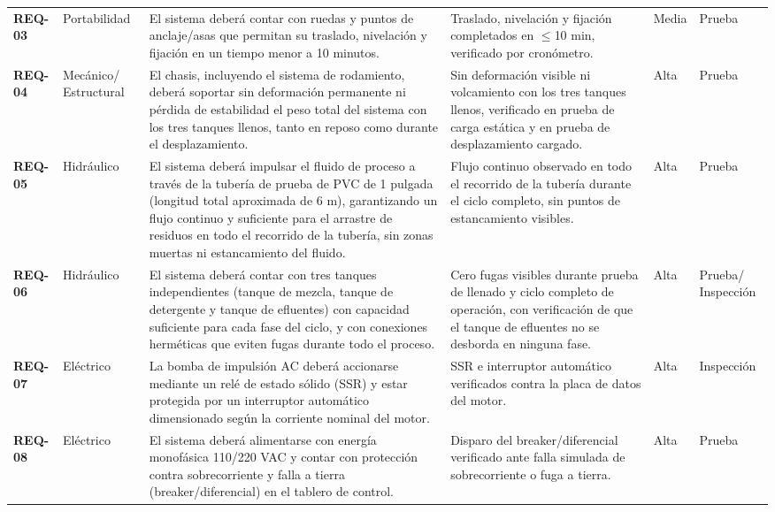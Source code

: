 \begin{longtable}{
  >{\bfseries}p{\colID}
  p{\colCat}
  p{\colReq}
  p{\colCrit}
  p{\colPrio}
  p{\colVer}
}
REQ-03 & Portabilidad & El sistema deberá contar con ruedas y puntos de anclaje/asas que permitan su traslado, nivelación y fijación en un tiempo menor a 10 minutos. & Traslado, nivelación y fijación completados en $\leq$10 min, verificado por cronómetro. & Media & Prueba \\[3pt]

REQ-04 & Mecánico/ Estructural & El chasis, incluyendo el sistema de rodamiento, deberá soportar sin deformación permanente ni pérdida de estabilidad el peso total del sistema con los tres tanques llenos, tanto en reposo como durante el desplazamiento. & Sin deformación visible ni volcamiento con los tres tanques llenos, verificado en prueba de carga estática y en prueba de desplazamiento cargado. & Alta & Prueba \\[3pt]

REQ-05 & Hidráulico & El sistema deberá impulsar el fluido de proceso a través de la tubería de prueba de PVC de 1 pulgada (longitud total aproximada de 6 m), garantizando un flujo continuo y suficiente para el arrastre de residuos en todo el recorrido de la tubería, sin zonas muertas ni estancamiento del fluido. & Flujo continuo observado en todo el recorrido de la tubería durante el ciclo completo, sin puntos de estancamiento visibles. & Alta & Prueba \\[3pt]

REQ-06 & Hidráulico & El sistema deberá contar con tres tanques independientes (tanque de mezcla, tanque de detergente y tanque de efluentes) con capacidad suficiente para cada fase del ciclo, y con conexiones herméticas que eviten fugas durante todo el proceso. & Cero fugas visibles durante prueba de llenado y ciclo completo de operación, con verificación de que el tanque de efluentes no se desborda en ninguna fase. & Alta & Prueba/ Inspección \\[3pt]
REQ-07 & Eléctrico & La bomba de impulsión AC deberá accionarse mediante un relé de estado sólido (SSR) y estar protegida por un interruptor automático dimensionado según la corriente nominal del motor. & SSR e interruptor automático verificados contra la placa de datos del motor. & Alta & Inspección \\[3pt]

REQ-08 & Eléctrico & El sistema deberá alimentarse con energía monofásica 110/220 VAC y contar con protección contra sobrecorriente y falla a tierra (breaker/diferencial) en el tablero de control. & Disparo del breaker/diferencial verificado ante falla simulada de sobrecorriente o fuga a tierra. & Alta & Prueba \\[3pt]


\end{longtable}
